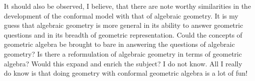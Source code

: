 \documentclass[12pt]{article}
\begin{document}
It should also be observed, I believe, that there are note worthy similarities in the
development of the conformal model with that of algebraic geometry.
It is my guess that algebraic geometry is more general in its
ability to answer geometric questions and in its breadth of geometric representation.
Could the concepts of geometric algebra be brought to bare in answering the questions of algebraic
geometry?  Is there a reformulation of algebraic geometry in terms of geometric algebra?
Would this expand and enrich the subject?  I do not know.  All I really do know is
that doing geometry with conformal geometric algebra is a lot of fun!




\end{document}

